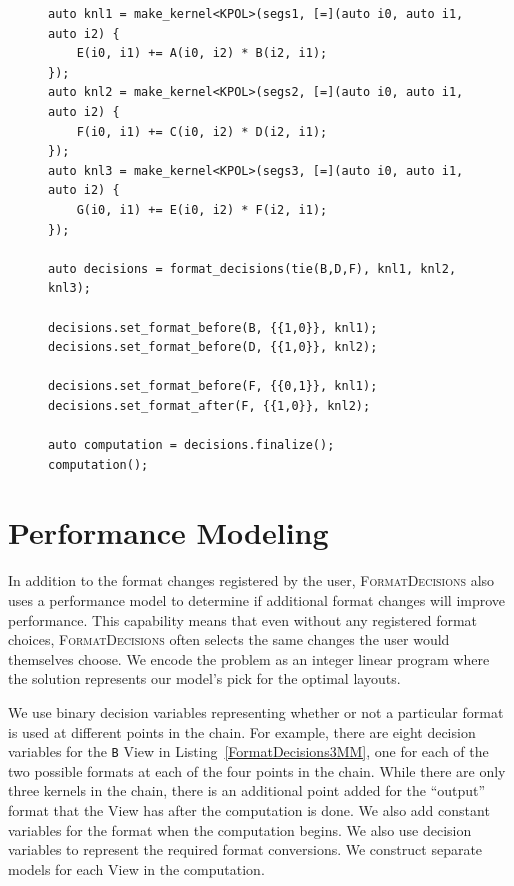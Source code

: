 \documentclass[sigconf,review=true]{acmart}
\newcommand{\FormatDecisions}[0]{{\textsc{FormatDecisions}}}
\begin{document}
\begin{figure}
\begin{lstlisting}[caption={The 3MM benchmark implemented using \FormatDecisions{}.},
	label={FormatDecisions3MM}]
auto knl1 = make_kernel<KPOL>(segs1, [=](auto i0, auto i1, auto i2) {
	E(i0, i1) += A(i0, i2) * B(i2, i1);
});
auto knl2 = make_kernel<KPOL>(segs2, [=](auto i0, auto i1, auto i2) {
	F(i0, i1) += C(i0, i2) * D(i2, i1);
});
auto knl3 = make_kernel<KPOL>(segs3, [=](auto i0, auto i1, auto i2) {
	G(i0, i1) += E(i0, i2) * F(i2, i1);
});

auto decisions = format_decisions(tie(B,D,F), knl1, knl2, knl3);

decisions.set_format_before(B, {{1,0}}, knl1);
decisions.set_format_before(D, {{1,0}}, knl2);

decisions.set_format_before(F, {{0,1}}, knl1);
decisions.set_format_after(F, {{1,0}}, knl2);

auto computation = decisions.finalize();
computation();
\end{lstlisting}
\end{figure}


\section{Performance Modeling}

In addition to the format changes registered by the user, \FormatDecisions{} also uses a performance model to determine if additional format changes will improve performance. 
This capability means that even without any registered format choices, \FormatDecisions{} often selects the same changes the user would themselves choose. 
We encode the problem as an integer linear program where the solution represents our model's pick for the optimal layouts.


We use binary decision variables representing whether or not a particular format is used at different points in the chain. 
For example, there are eight decision variables for the \verb.B. View in Listing~\ref{FormatDecisions3MM}, one for each of the two possible formats at each of the four points in the chain. 
While there are only three kernels in the chain, there is an additional point added for the \enquote{output} format that the View has after the computation is done.
We also add constant variables for the format when the computation begins. 
We also use decision variables to represent the required format conversions.
We construct separate models for each View in the computation. 
\end{document}
